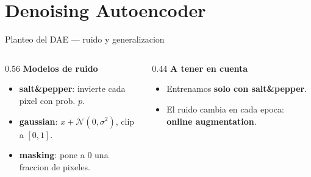 \documentclass[aspectratio=169, 10pt]{beamer}
\begin{document}

\section{Denoising Autoencoder}

\begin{frame}{Planteo del DAE --- ruido y generalizacion}
  \begin{columns}[T]
    \begin{column}{0.56\textwidth}
      \textbf{Modelos de ruido}
      \begin{itemize}
        \item \textbf{salt\&pepper}: invierte cada pixel con prob. $p$.
        \item \textbf{gaussian}: $x + \mathcal{N}(0,\sigma^2)$, clip a $[0,1]$.
        \item \textbf{masking}: pone a 0 una fraccion de pixeles.
      \end{itemize}
    \end{column}
    \begin{column}{0.44\textwidth}
      \textbf{A tener en cuenta}
      \begin{itemize}
        \item Entrenamos \textbf{solo con salt\&pepper}.
        \item El ruido cambia en cada epoca: \textbf{online augmentation}.

      \end{itemize}
    \end{column}
  \end{columns}
\end{frame}
\end{document}
